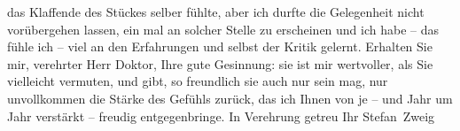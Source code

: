                das Klaffende des Stückes
               selber fühlte, aber ich durfte die Gelegenheit nicht vorübergehen lassen, ein mal an
               solcher Stelle zu erscheinen und ich habe – {\pb}das fühle ich – viel an den Erfahrungen
               und selbst der Kritik gelernt. Erhalten Sie mir, verehrter Herr Doktor, Ihre gute
               Gesinnung: sie ist mir wertvoller, als Sie vielleicht vermuten, und gibt, so
               freundlich sie auch nur sein mag, nur unvollkommen die Stärke des Gefühls zurück, das
               ich Ihnen von je – und Jahr um Jahr verstärkt – freudig entgegenbringe. In Verehrung
               getreu Ihr\pend
           \pstart \spacefill\mbox{Stefan Zweig}\pend{}\endnumbering{}  \newcommand{\dateiname}{L03640}\newcommand{\titel}{Stefan Zweig an Arthur Schnitzler, [27. 10. 1912?]}\newcommand{\editorInnen}{Selma Jahnke und Martin Anton Müller}

